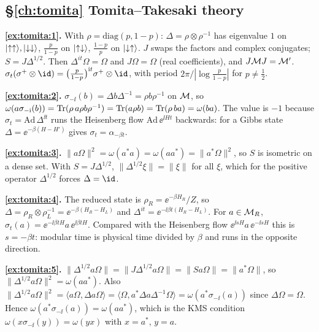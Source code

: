 {\subsection*{\S\ref{ch:tomita} Tomita--Takesaki theory}
\textbf{\ref{ex:tomita:1}.} With $\rho=\mathrm{diag}(p,1-p)$: $\Delta=\rho\otimes\rho^{-1}$ has eigenvalue $1$ on $\lvert \uparrow\uparrow\rangle,\lvert \downarrow\downarrow\rangle$, $\frac p{1-p}$ on $\lvert \uparrow\downarrow\rangle$, $\frac{1-p}p$ on $\lvert \downarrow\uparrow\rangle$. $J$ swaps the factors and complex conjugates; $S=J\Delta^{1/2}$. Then $\Delta^{it}\Omega=\Omega$ and $J\Omega=\Omega$ (real coefficients), and $J\mathcal{M} J=\mathcal{M}'$. $\sigma_t(\sigma^+\otimes\id)=\big(\frac p{1-p}\big)^{\ii t}\sigma^+\otimes\id$, with period $2\pi/|\log\frac p{1-p}|$ for $p\ne\frac12$.\par
\textbf{\ref{ex:tomita:2}.} $\sigma_{-\ii}(b)=\Delta b\Delta^{-1}=\rho b\rho^{-1}$ on $\mathcal{M}$, so $\omega(a\sigma_{-\mathrm{i}}(b))=\operatorname{Tr}(\rho\,a\rho b\rho^{-1})=\operatorname{Tr}(a\rho b)=\operatorname{Tr}(\rho\,ba)=\omega(ba)$. The value is $-1$ because $\sigma_t=\mathrm{Ad}\,\Delta^{\ii t}$ runs the Heisenberg flow $\mathrm{Ad}\,\ee^{\ii Ht}$ backwards: for a Gibbs state $\Delta=\ee^{-\beta(H-H')}$ gives $\sigma_t=\alpha_{-\beta t}$.\par
\textbf{\ref{ex:tomita:3}.} $\|a\Omega\|^2=\omega(a^*a)=\omega(aa^*)=\|a^*\Omega\|^2$, so $S$ is isometric on a dense set. With $S=J\Delta^{1/2}$, $\|\Delta^{1/2}\xi\|=\|\xi\|$ for all $\xi$, which for the positive operator $\Delta^{1/2}$ forces $\Delta=\id$.\par
\textbf{\ref{ex:tomita:4}.} The reduced state is $\rho_R=\ee^{-\beta H_R}/Z$, so $\Delta=\rho_R\otimes\rho_L^{-1}=\ee^{-\beta(H_R-H_L)}$ and $\Delta^{it}=\ee^{-\ii\beta t(H_R-H_L)}$. For $a\in\mathcal{M}_R$, $\sigma_t(a)=\ee^{-\ii\beta tH}a\,\ee^{\ii\beta tH}$. Compared with the Heisenberg flow $\ee^{\ii sH}a\,\ee^{-\ii sH}$ this is $s=-\beta t$: modular time is physical time divided by $\beta$ and runs in the opposite direction.\par
\textbf{\ref{ex:tomita:5}.} $\|\Delta^{1/2}a\Omega\|=\|J\Delta^{1/2}a\Omega\|=\|Sa\Omega\|=\|a^*\Omega\|$, so $\|\Delta^{1/2}a\Omega\|^2=\omega(aa^*)$. Also $\|\Delta^{1/2}a\Omega\|^2=\langle a\Omega,\Delta a\Omega\rangle=\langle\Omega,a^*\Delta a\Delta^{-1}\Omega\rangle=\omega(a^*\sigma_{-\ii}(a))$ since $\Delta\Omega=\Omega$. Hence $\omega(a^*\sigma_{-\ii}(a))=\omega(aa^*)$, which is the KMS condition $\omega(x\sigma_{-\ii}(y))=\omega(yx)$ with $x=a^*$, $y=a$.\par

}
